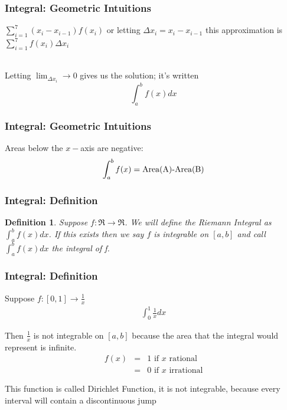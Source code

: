 \documentclass{beamer}
\newtheorem{defn}{Definition}
\numberwithin{equation}{section}
\begin{document}
\begin{frame}
\frametitle{Integral: Geometric Intuitions}

\begin{center}
\end{center}
  
$\sum_{i=1}^7 (x_i-x_{i-1})f(x_i)$  or letting $\Delta x_i=x_i-x_{i-1}$ this approximation is
$\sum_{i=1}^7 f(x_i) \Delta x_i$ \pause

\ \\Letting $\lim_{\Delta x_i}\rightarrow 0$ gives us the solution; it's written $$\int_a^b f(x) dx$$

\end{frame}



\begin{frame}
\frametitle{Integral: Geometric Intuitions}

Areas below the $x-$axis are negative: $$\int_a^b f(x)=\hbox{Area(A)-Area(B)}$$
  
\begin{center}
\end{center}

\end{frame}



\begin{frame}
\frametitle{Integral: Definition}

\begin{defn} Suppose $f:\Re \rightarrow \Re$.  We will define the Riemann Integral as $\int_{a}^{b} f(x) dx$.  If this exists then we say $f$ is \alert{integrable} on $[a,b]$ and call $\int_{a}^{b} f(x) dx$ the \alert{integral} of f.  
\end{defn}

\end{frame}



\begin{frame}
\frametitle{Integral: Definition}

Suppose $f:[0,1]\rightarrow \frac{1}{x}$ 
\begin{eqnarray}
\int_{0}^{1} \frac{1}{x} dx \nonumber 
\end{eqnarray} \pause 

Then $\frac{1}{x}$ is not integrable on $[a,b]$ because the area that the integral would represent is infinite.  \pause \\ 

\begin{eqnarray}
f(x) & = & 1 \text{ if $x$ rational} \nonumber \\
	 & = & 0 \text{ if $x$ irrational} \nonumber 
\end{eqnarray} \pause 

This function is called Dirichlet Function, it is not integrable, because every interval will contain a discontinuous jump 

\end{frame}
\end{document}
